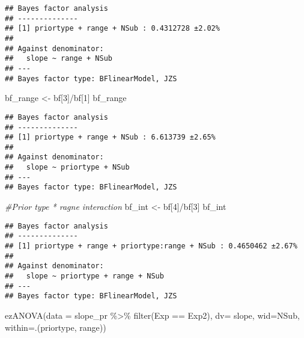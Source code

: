 \documentclass[
]{article}
\newenvironment{Shaded}{\begin{snugshade}}{\end{snugshade}}
\newcommand{\AttributeTok}[1]{\textcolor[rgb]{0.77,0.63,0.00}{#1}}
\newcommand{\CommentTok}[1]{\textcolor[rgb]{0.56,0.35,0.01}{\textit{#1}}}
\newcommand{\DecValTok}[1]{\textcolor[rgb]{0.00,0.00,0.81}{#1}}
\newcommand{\FunctionTok}[1]{\textcolor[rgb]{0.00,0.00,0.00}{#1}}
\newcommand{\NormalTok}[1]{#1}
\newcommand{\OtherTok}[1]{\textcolor[rgb]{0.56,0.35,0.01}{#1}}
\newcommand{\SpecialCharTok}[1]{\textcolor[rgb]{0.00,0.00,0.00}{#1}}
\newcommand{\StringTok}[1]{\textcolor[rgb]{0.31,0.60,0.02}{#1}}
\begin{document}
\begin{verbatim}
## Bayes factor analysis
## --------------
## [1] priortype + range + NSub : 0.4312728 ±2.02%
## 
## Against denominator:
##   slope ~ range + NSub 
## ---
## Bayes factor type: BFlinearModel, JZS
\end{verbatim}

\begin{Shaded}
\begin{Highlighting}[]
\NormalTok{bf\_range }\OtherTok{\textless{}{-}}\NormalTok{ bf[}\DecValTok{3}\NormalTok{]}\SpecialCharTok{/}\NormalTok{bf[}\DecValTok{1}\NormalTok{]}
\NormalTok{bf\_range}
\end{Highlighting}
\end{Shaded}

\begin{verbatim}
## Bayes factor analysis
## --------------
## [1] priortype + range + NSub : 6.613739 ±2.65%
## 
## Against denominator:
##   slope ~ priortype + NSub 
## ---
## Bayes factor type: BFlinearModel, JZS
\end{verbatim}

\begin{Shaded}
\begin{Highlighting}[]
\CommentTok{\#Prior type * ragne interaction }
\NormalTok{bf\_int }\OtherTok{\textless{}{-}}\NormalTok{ bf[}\DecValTok{4}\NormalTok{]}\SpecialCharTok{/}\NormalTok{bf[}\DecValTok{3}\NormalTok{] }
\NormalTok{bf\_int}
\end{Highlighting}
\end{Shaded}

\begin{verbatim}
## Bayes factor analysis
## --------------
## [1] priortype + range + priortype:range + NSub : 0.4650462 ±2.67%
## 
## Against denominator:
##   slope ~ priortype + range + NSub 
## ---
## Bayes factor type: BFlinearModel, JZS
\end{verbatim}

\begin{Shaded}
\begin{Highlighting}[]
\FunctionTok{ezANOVA}\NormalTok{(}\AttributeTok{data =}\NormalTok{ slope\_pr }\SpecialCharTok{\%\textgreater{}\%} \FunctionTok{filter}\NormalTok{(Exp }\SpecialCharTok{==} \StringTok{\textquotesingle{}Exp2\textquotesingle{}}\NormalTok{), }\AttributeTok{dv=}\NormalTok{ slope, }\AttributeTok{wid=}\NormalTok{NSub, }\AttributeTok{within=}\NormalTok{.(priortype, range))}
\end{Highlighting}
\end{Shaded}
\end{document}
